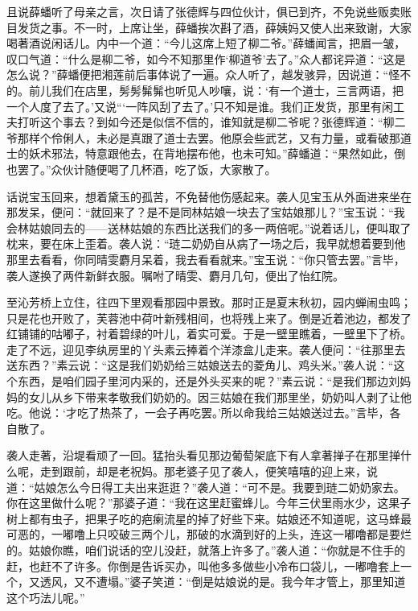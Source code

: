 \begin{parag}


    且说薛蟠听了母亲之言，次日请了张德辉与四位伙计，俱已到齐，不免说些贩卖账目发货之事。不一时，上席让坐，薛蟠挨次斟了酒，薛姨妈又使人出来致谢，大家喝著酒说闲话儿。内中一个道：“今儿这席上短了柳二爷。”薛蟠闻言，把眉一皱，叹口气道：“什么是柳二爷，如今不知那里作‘柳道爷’去了。”众人都诧异道：“这是怎么说？”薛蟠便把湘莲前后事体说了一遍。众人听了，越发骇异，因说道：“怪不的。前儿我们在店里，髣髣髴髴也听见人吵嚷，说：‘有一个道士，三言两语，把一个人度了去了。’又说“‘一阵风刮了去了。’只不知是谁。我们正发货，那里有闲工夫打听这个事去？到如今还是似信不信的，谁知就是柳二爷呢？张德辉道：“柳二爷那样个伶俐人，未必是真跟了道士去罢。他原会些武艺，又有力量，或看破那道士的妖术邪法，特意跟他去，在背地摆布他，也未可知。”薛蟠道：“果然如此，倒也罢了。”众伙计随便喝了几杯酒，吃了饭，大家散了。
\end{parag}


\begin{parag}


    话说宝玉回来，想着黛玉的孤苦，不免替他伤感起来。袭人见宝玉从外面进来坐在那发呆，便问：“就回来了？是不是同林姑娘一块去了宝姑娘那儿？”宝玉说：“我会林姑娘同去的——送林姑娘的东西比送我们的多一两倍呢。”说着话儿，便叫取了枕来，要在床上歪着。袭人说：“琏二奶奶自从病了一场之后，我早就想着要到他那里去看看，你同晴雯麝月呆着，我去看看就来。”宝玉说：“你只管去罢。”言毕，袭人遂换了两件新鲜衣服。嘱咐了晴雯、麝月几句，便出了怡红院。
\end{parag}


\begin{parag}


    至沁芳桥上立住，往四下里观看那园中景致。那时正是夏末秋初，园内蝉闹虫鸣；只是花也开败了，芙蓉池中荷叶新残相间，也将残上来了。倒是近着池边，都发了红铺铺的咕嘟子，衬着碧绿的叶儿，着实可爱。于是一壁里瞧着，一壁里下了桥。走了不远，迎见李纨房里的丫头素云捧着个洋漆盒儿走来。袭人便问：“往那里去送东西？”素云说：“这是我们奶奶给三姑娘送去的菱角儿、鸡头米。”袭人说：“这个东西，是咱们园子里河内采的，还是外头买来的呢？”素云说：“是我们那边刘妈妈的女儿从乡下带来孝敬我们奶奶的。因三姑娘在我们那里坐，奶奶叫人剥了让他吃。他说：‘才吃了热茶了，一会子再吃罢。’所以命我给三姑娘送过去。”言毕，各自散了。
\end{parag}


\begin{parag}


    袭人走著，沿堤看顽了一回。猛抬头看见那边葡萄架底下有人拿著掸子在那里掸什么呢，走到跟前，却是老祝妈。那老婆子见了袭人，便笑嘻嘻的迎上来，说道：“姑娘怎么今日得工夫出来逛逛？”袭人道：“可不是。我要到琏二奶奶家去。你在这里做什么呢？”那婆子道：“我在这里赶蜜蜂儿。今年三伏里雨水少，这果子树上都有虫子，把果子吃的疤瘌流星的掉了好些下来。姑娘还不知道呢，这马蜂最可恶的，一嘟噜上只咬破三两个儿，那破的水滴到好的上头，连这一嘟噜都是要烂的。姑娘你瞧，咱们说话的空儿没赶，就落上许多了。”袭人道：“你就是不住手的赶，也赶不了许多。你倒是告诉买办，叫他多多做些小冷布口袋儿，一嘟噜套上一个，又透风，又不遭塌。”婆子笑道：“倒是姑娘说的是。我今年才管上，那里知道这个巧法儿呢。”
\end{parag}



